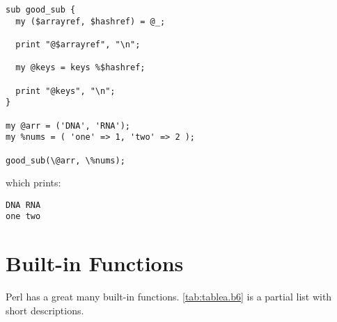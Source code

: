 \begin{lstlisting}
sub good_sub {
  my ($arrayref, $hashref) = @_;

  print "@$arrayref", "\n";

  my @keys = keys %$hashref;

  print "@keys", "\n";
}

my @arr = ('DNA', 'RNA');
my %nums = ( 'one' => 1, 'two' => 2 );

good_sub(\@arr, \%nums);
\end{lstlisting}

which prints:

\begin{lstlisting}
DNA RNA
one two
\end{lstlisting}

\section{Built-in Functions}
Perl has a great many built-in functions. \autoref{tab:tablea.b6} is a partial list with short descriptions.

